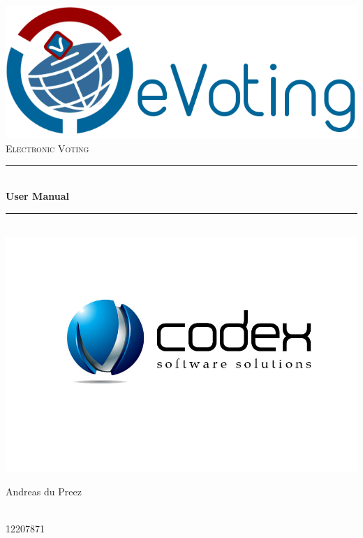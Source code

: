 \begin{titlepage}
	
	\begin{center}
		\includegraphics[width=1\textwidth]{../Images/eVoting_Logo.png}\\[0.5cm]    
		\textsc{\LARGE Electronic Voting}\\[0.5cm]
		\rule{\linewidth}{0.5mm} \\[0.4cm]
		{ \huge \bfseries User Manual}\\[0.5cm]
		\rule{\linewidth}{0.5mm} \\[1cm]
		
		\includegraphics[width=1\textwidth]{../Images/TeamCodexLogo.jpg}\\[0.5cm]    	
		
		
		\begin{minipage}{0.4\textwidth}
			\begin{flushleft} \large
				Andreas {du Preez}
			\end{flushleft}
		\end{minipage}
		\begin{minipage}{0.4\textwidth}
			\begin{flushright} \large
				\emph{} \\
				12207871 
			\end{flushright}
		\end{minipage}
		

\end{center}
\end{titlepage}
